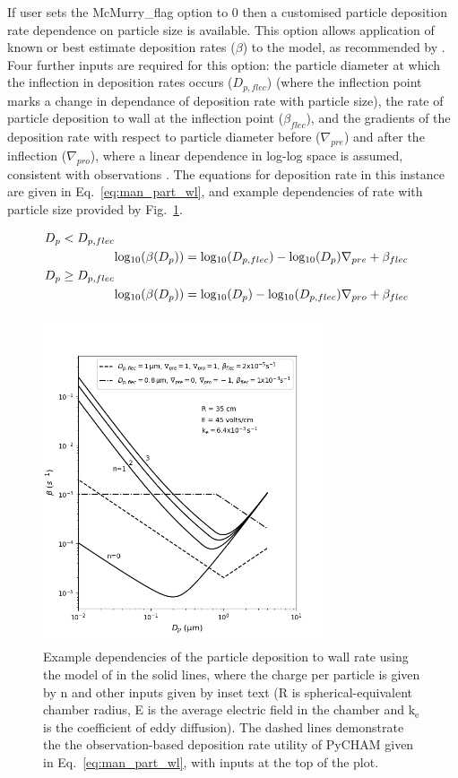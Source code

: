 \documentclass[gmd, manuscript]{copernicus}
\begin{document}
If user sets the McMurry\_flag option to 0 then a customised particle deposition rate dependence on particle size is available.  This option allows application of known or best estimate deposition rates ($\beta$) to the model, as recommended by \citet{Wang2018}.  Four further inputs are required for this option: the particle diameter at which the inflection in deposition rates occurs ($D_{p,flec}$) (where the inflection point marks a change in dependance of deposition rate with particle size), the rate of particle deposition to wall at the inflection point ($\beta_{flec}$), and the gradients of the deposition rate with respect to particle diameter before ($\nabla_{pre}$) and after the inflection ($\nabla_{pro}$), where a linear dependence in log-log space is assumed, consistent with observations \citep{Charan2019}.  The equations for deposition rate in this instance are given in Eq.~\ref{eq:man_part_wl}, and example dependencies of rate with particle size provided by Fig.~\ref{fig:part_wall_depo_plot}.

\begin{align} \label{eq:man_part_wl}
D_{p}<D_{p,flec} \nonumber \\
&\rm{log_{10}}(\mit{\beta(D_{p}})) = \rm{log_{10}}(\mit{D_{p,flec}})-\rm{log_{10}}\mit{(D_{p})}\nabla_{pre}+\beta_{flec} \nonumber \\
D_{p}\geq D_{p,flec} \nonumber \\
&\rm{log_{10}}(\mit{\beta(D_{p}})) = \rm{log_{10}}(\mit{D_{p}})-\rm{log_{10}}\mit{(D_{p,flec})}\nabla_{pro}+\beta_{flec}
\end{align}

\begin{figure}[t]
\includegraphics[width=8.3cm]{Results/test_wallloss_plot.png}
\caption{Example dependencies of the particle deposition to wall rate using the model of \citet{McMurry1985} in the solid lines, where the charge per particle is given by n and other inputs given by inset text (R is spherical-equivalent chamber radius, E is the average electric field in the chamber and $\mathrm{k_e}$ is the coefficient of eddy diffusion).  The dashed lines demonstrate the the observation-based deposition rate utility of PyCHAM given in Eq.~\ref{eq:man_part_wl}, with inputs at the top of the plot.}
\label{fig:part_wall_depo_plot}
\end{figure}
\end{document}
